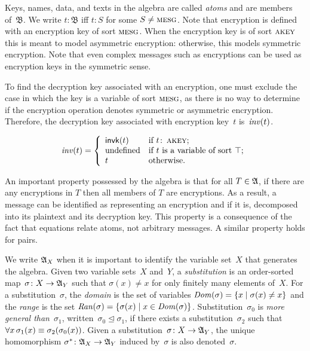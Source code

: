 \documentclass[12pt]{article}
\theoremstyle{definition}
\newcommand{\scap}[1]{\ensuremath{\mathop{\relax
                    \smash{\mbox{\sc#1}}}\!\mathop{\vphantom{#1}}\nolimits}}
\newcommand{\alga}{\alg{A}}
\newcommand{\base}{\ensuremath{\mathfrak B}}
\newcommand{\sdom}{\fn{Dom}}
\newcommand{\sran}{\fn{Ran}}
\begin{document}
Keys, names, data, and texts in the algebra are called \emph{atoms} and
are members of~$\base$.  We write $t\colon\base$ iff $t\colon S$ for
some $S \neq \scap{mesg}$.  Note that encryption is defined with an
encryption key of sort $\scap{mesg}$.  When the encryption key is of sort
$\scap{akey}$ this is meant to model asymmetric encryption: otherwise,
this models symmetric encryption.  Note that even complex messages such
as encryptions can be used as encryption keys in the symmetric sense.

To find the decryption key associated with an encryption, one must
exclude the case in which the key is a variable of sort \scap{mesg},
as there is no way to determine if the encryption operation denotes
symmetric or asymmetric encryption.  Therefore, the decryption key
associated with encryption key~$t$ is~$\operatorname{\mathit{inv}}(t)$.

$$\fn{inv}(t) =\left\{
\begin{array}{ll}
\cn{invk}(t)&\mbox{if $t\colon\scap{akey}$;}\\
\mbox{undefined}&\mbox{if $t$ is a variable of sort $\top$;}\\
t&\mbox{otherwise.}
\end{array}\right.$$

An important property possessed by the algebra is that for all $T\in\alga$,
if there are any encryptions in $T$ then all members of $T$ are encryptions.
As a result, a message can be identified as representing an encryption
and if it is, decomposed into its plaintext and its decryption key.
This property is a consequence of the fact that equations relate
atoms, not arbitrary messages.  A similar property holds for pairs.

We write $\alga_X$ when it is important to identify the variable
set~$X$ that generates the algebra.  Given two variable sets~$X$
and~$Y$, a \emph{substitution} is an order-sorted map~$\sigma\colon
X\rightarrow\alga_Y$ such that $\sigma(x)\neq x$ for only finitely
many elements of~$X$.  For a substitution~$\sigma$, the \emph{domain}
is the set of variables $\sdom(\sigma)=\{x\mid \sigma(x)\neq x\}$ and
the \emph{range} is the set $\sran(\sigma)=\{\sigma(x)\mid
x\in\sdom(\sigma)\}$.  Substitution~$\sigma_0$ is \emph{more general than}~$\sigma_1$,
written~$\sigma_0\unlhd\sigma_1$, if there exists a
substitution~$\sigma_2$ such that
$\mathop{\forall x}\sigma_1(x)\equiv\sigma_2(\sigma_0(x))$.  Given a
substitution~$\sigma\colon X\rightarrow\alga_Y$, the unique
homomorphism $\sigma^\ast\colon \alga_X\rightarrow\alga_Y$ induced
by~$\sigma$ is also denoted~$\sigma$.
\end{document}
